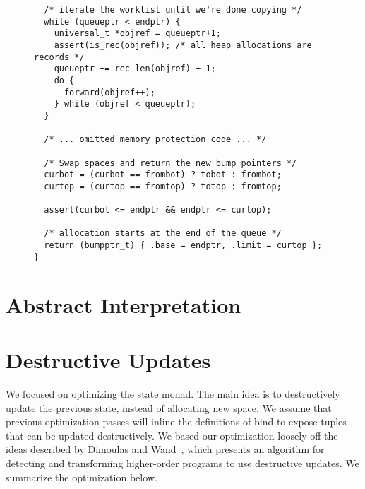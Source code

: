 \documentclass{article}
\begin{document}
\begin{figure}
\begin{lstlisting}
  /* iterate the worklist until we're done copying */
  while (queueptr < endptr) {
    universal_t *objref = queueptr+1;
    assert(is_rec(objref)); /* all heap allocations are records */
    queueptr += rec_len(objref) + 1;
    do {
      forward(objref++);
    } while (objref < queueptr);
  }

  /* ... omitted memory protection code ... */

  /* Swap spaces and return the new bump pointers */
  curbot = (curbot == frombot) ? tobot : frombot;
  curtop = (curtop == fromtop) ? totop : fromtop;

  assert(curbot <= endptr && endptr <= curtop);

  /* allocation starts at the end of the queue */
  return (bumpptr_t) { .base = endptr, .limit = curtop };
}
\end{lstlisting}
\end{figure}

\section{Abstract Interpretation}
\label{sec:abstract-interp}



\section{Destructive Updates}
\label{sec:destructive-updates}

We focused on optimizing the state monad. The main idea is to destructively update the previous state, instead of allocating new space. We assume that previous optimization passes will inline the definitions of bind to expose tuples that can be updated destructively. We based our optimization loosely off the ideas described by Dimoulas and Wand~\cite{dimoulas2009higher}, which presents an algorithm for detecting and transforming higher-order programs to use destructive updates. We summarize the optimization below. 
\end{document}
